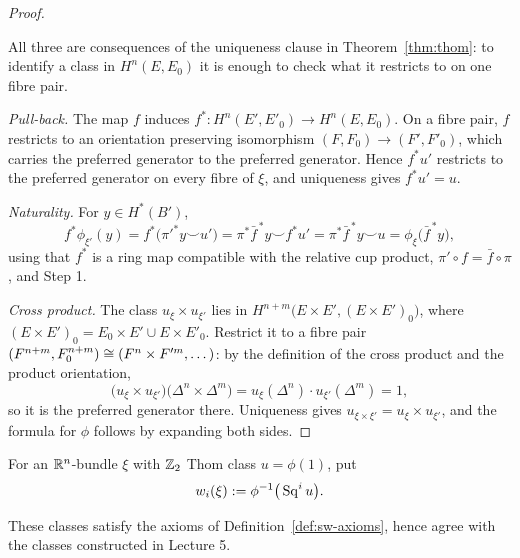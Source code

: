 \begin{proof}
\begin{strategy}
All three are consequences of the uniqueness clause in
Theorem~\ref{thm:thom}: to identify a class in $H^n(E,E_0)$ it is enough to
check what it restricts to on one fibre pair.
\end{strategy}

 \emph{Pull-back.} The map $f$ induces
$f^*\colon H^n(E',E'_0)\to H^n(E,E_0)$. On a fibre pair, $f$ restricts to an
orientation preserving isomorphism $(F,F_0)\to(F',F'_0)$, which carries the
preferred generator to the preferred generator. Hence $f^*u'$ restricts to the
preferred generator on every fibre of $\xi$, and uniqueness gives $f^*u'=u$.

 \emph{Naturality.} For $y\in H^*(B')$,
\[
f^*\phi_{\xi'}(y)=f^*\big(\pi'^*y\smile u'\big)
=\pi^*\bar f^{\,*}y\smile f^*u'
=\pi^*\bar f^{\,*}y\smile u
=\phi_\xi\big(\bar f^{\,*}y\big),
\]
using that $f^*$ is a ring map compatible with the relative cup product,
$\pi'\circ f=\bar f\circ\pi$, and Step 1.

 \emph{Cross product.} The class $u_\xi\times u_{\xi'}$ lies in
$H^{n+m}\big(E\times E',(E\times E')_0\big)$, where
$(E\times E')_0=E_0\times E'\cup E\times E'_0$. Restrict it to a fibre pair
$(F^{n+m},F^{n+m}_0)\cong(F^n\times F'^m,\dots)$: by the definition of the cross
product and the product orientation,
\[
\big(u_\xi\times u_{\xi'}\big)\big(\Delta^{n}\times\Delta^{m}\big)
=u_\xi(\Delta^n)\cdot u_{\xi'}(\Delta^m)=1 ,
\]
so it is the preferred generator there. Uniqueness gives
$u_{\xi\times\xi'}=u_\xi\times u_{\xi'}$, and the formula for $\phi$ follows by
expanding both sides.
\end{proof}

\begin{definition}
For an $\mathbb{R}^n$-bundle $\xi$ with $\mathbb{Z}_2$ Thom class $u=\phi(1)$, put
\[
w_i(\xi):=\phi^{-1}\big(\operatorname{Sq}^i u\big).
\]
\end{definition}

\begin{proposition}
These classes satisfy the axioms of Definition~\ref{def:sw-axioms}, hence agree
with the classes constructed in Lecture 5.
\end{proposition}

